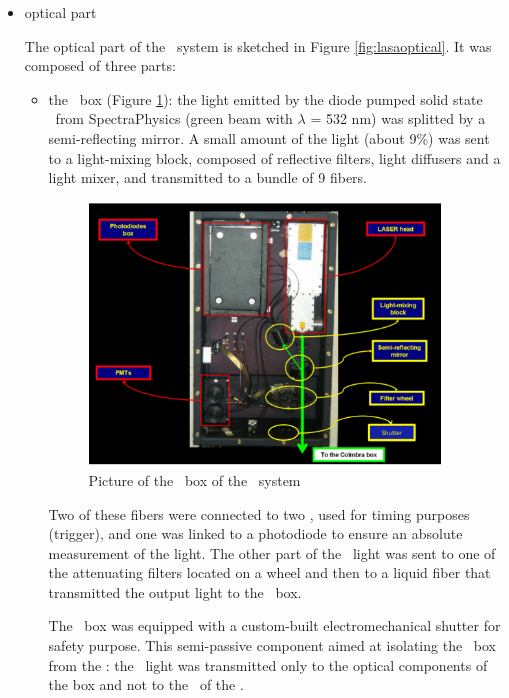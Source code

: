 \begin{itemize}
\item optical part 

	The optical part of the \lasi~system is sketched in Figure \ref{fig:lasaoptical}. It was composed of three parts:
	\begin{itemize}
	\item the \las~box (Figure \ref{fig:lasabox}): the light emitted by the diode pumped solid state \las~from SpectraPhysics \cite{ref:laser} (green beam with $\lambda$ = 532 nm) was splitted by a semi-reflecting mirror. A small amount of the light (about 9\%) was sent to a light-mixing block, composed of reflective filters, light diffusers and a light mixer, and transmitted to a bundle of 9 fibers. \par
		\begin{figure}[htbp]
			\centering
			\includegraphics[height=7cm]{figures/LaserIBox.pdf}
			\caption{Picture of the \las~box of the \lasi~system}\label{fig:lasabox}
		\end{figure}	
			
		Two of these fibers were connected to two \pmts, used for timing purposes (trigger), and one was linked to a photodiode to ensure an absolute measurement of the light. The other part of the \las~light was sent to one of the attenuating filters located on a wheel and then to a liquid fiber that transmitted the output light to the \coimbra~box. \par
                 The \las~box was equipped with a custom-built electromechanical shutter for safety purpose. This semi-passive component aimed at isolating the \las~box from the \tilecal: the \las~light was transmitted only to the optical components of the box and not to the \pmts~of the \tilecal. 


\end{itemize}
\end{itemize}
